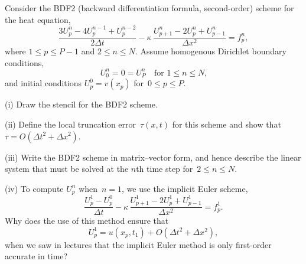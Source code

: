 \begin{Exercises}
\exercise
Consider the BDF2 (backward differentiation formula, second-order)
scheme for the heat equation,
\[
\frac{3U^n_p-4U^{n-1}_p+U^{n-2}_p}{2\Delta t}
        -\kappa\,\frac{U^n_{p+1}-2U^n_p+U^n_{p-1}}{\Delta x^2}=f^n_p,
\]
where $1\le p\le P-1$ and $2\le n\le N$.  Assume homogenous Dirichlet
boundary conditions,
\[
U^n_0=0=U^n_P\quad\text{for $1\le n\le N$,}
\]
and initial conditions $U^0_p=v(x_p)$ for~$0\le p\le P$.
\begin{description}
\item{(i)} Draw the stencil for the BDF2 scheme.
\item{(ii)} Define the local truncation error~$\tau(x,t)$ for this
scheme and show that $\tau=O(\Delta t^2+\Delta x^2)$.
\item{(iii)} Write the BDF2 scheme in matrix--vector form, and hence
describe the linear system that must be solved at the $n$th time step
for~$2\le n\le N$.
\item{(iv)} To compute $U^n_p$ when~$n=1$, we use the implicit Euler
scheme,
\[
\frac{U^1_p-U^0_p}{\Delta t}
        -\kappa\,\frac{U^1_{p+1}-2U^1_p+U^1_{p-1}}{\Delta x^2}=f^1_p.
\]
Why does the use of this method ensure that
\[
U^1_p=u(x_p,t_1)+O(\Delta t^2+\Delta x^2),
\]
when we saw in lectures that the implicit Euler method is only
first-order accurate in time?  
\end{description}

\end{Exercises}
